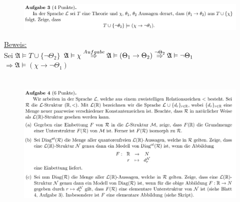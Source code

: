 \documentclass[a4paper]{scrartcl}
\begin{document}
\section*{}%
\label{sec:aufgabe_3}

    \begin{figure}[H]
        \centering
        \includegraphics[scale=0.3]{./A-3.png}
        \label{fig:}
    \end{figure}

    \underline{Beweis:}\\
        Sei $\mathfrak{A} \vDash T \cup \{\neg \Theta_2\}$
        $\mathfrak{A} \vDash \chi\\
        \overset{Aufgabe}{\Rightarrow} \mathfrak{A} \vDash (\Theta_1 \rightarrow \Theta_2)\\
        \overset{\neg \Theta_2}{\Rightarrow} \mathfrak{A} \vDash \neg \Theta_1$\\
        $\Rightarrow \mathfrak{A} \vDash (\chi \rightarrow \neg \Theta_1)$\\


\section*{}%
\label{sec:aufgabe_4}

    \begin{figure}[H]
        \centering
        \includegraphics[scale=0.3]{./A-4.png}
        \label{fig:}
    \end{figure}
\end{document}
